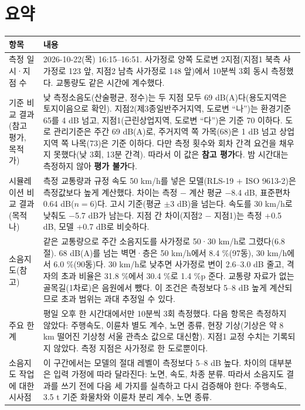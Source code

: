 \documentclass[10.5pt,a4paper]{article}
\newcommand{\hd}[1]{\cellcolor{headfill}\textbf{\sffamily #1}}
\begin{document}
\section{요약}
\small
\begin{longtable}{L{0.24}L{0.76}}
\toprule
\hd{항목} & \hd{내용} \\ \midrule
\endhead
\bottomrule
\endlastfoot
측정 일시·지점 수 & 2026-10-22(목) 16:15--16:51. 사가정로 양쪽 도로변 2지점(지점1 북측 사가정로 123 앞, 지점2 남측 사가정로 148 앞)에서 10분씩 3회 동시 측정했다. 교통량도 같은 시간에 계수했다. \\ \midrule
기준 비교 결과(참고 평가, 목적 가) & 낮 측정소음도(산술평균, 정수)는 두 지점 모두 69 dB(A)다(용도지역은 토지이음으로 확인). 지점2(제3종일반주거지역, 도로변 ``나'')는 환경기준 65를 4 dB 넘고, 지점1(근린상업지역, 도로변 ``다'')은 기준 70 이하다. 도로 관리기준은 주간 69 dB(A)로, 주거지역 쪽 가목(68)은 1 dB 넘고 상업지역 쪽 나목(73)은 기준 이하다. 다만 측정 횟수와 회차 간격 요건을 채우지 못했다(낮 3회, 13분 간격). 따라서 이 값은 \textbf{참고 평가}다. 밤 시간대는 측정하지 않아 \textbf{평가 불가}다. \\ \midrule
시뮬레이션 비교 결과(목적 나) & 측정 교통량과 규정 속도 50 km/h를 넣은 모델(RLS-19 + ISO 9613-2)은 측정값보다 높게 계산했다. 차이는 측정 $-$ 계산 평균 $-$8.4 dB, 표준편차 0.64 dB($n=6$)다. 고시 기준(평균 $\pm$3 dB)을 넘는다. 속도를 30 km/h로 낮춰도 $-$5.7 dB가 남는다. 지점 간 차이(지점2 $-$ 지점1)는 측정 +0.5 dB, 모델 +0.7 dB로 비슷하다. \\ \midrule
소음지도(참고) & 같은 교통량으로 주간 소음지도를 사가정로 50·30 km/h로 그렸다(6.8절). 68 dB(A)를 넘는 벽면·층은 50 km/h에서 8.4 \%(97동), 30 km/h에서 6.0 \%(90동)다. 30 km/h로 낮추면 사가정로 변이 2.6--3.0 dB 줄고, 격자의 초과 비율은 31.8 \%에서 30.4 \%로 1.4 \%p 준다. 교통량 자료가 없는 골목길(1차로)은 음원에서 뺐다. 이 조건은 측정보다 5--8 dB 높게 계산되므로 초과 범위는 과대 추정일 수 있다. \\ \midrule
주요 한계 & 평일 오후 한 시간대에서만 10분씩 3회 측정했다. 다음 항목은 측정하지 않았다: 주행속도, 이륜차 별도 계수, 노면 종류, 현장 기상(기상은 약 8 km 떨어진 기상청 서울 관측소 값으로 대신함). 지점1 교정 수치는 기록되지 않았다. 측정 지점은 사가정로 한 도로뿐이다. \\ \midrule
소음지도 작업에 대한 시사점 & 이 구간에서는 모델의 절대 레벨이 측정보다 5--8 dB 높다. 차이의 대부분은 입력 가정에 따라 달라진다: 노면, 속도, 차종 분류. 따라서 소음지도 결과를 쓰기 전에 다음 세 가지를 실측하고 다시 검증해야 한다: 주행속도, 3.5 t 기준 화물차와 이륜차 분리 계수, 노면 종류. \\*
\end{longtable}
\addtocounter{table}{-1}
\normalsize
\end{document}
